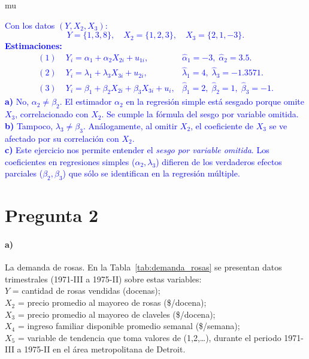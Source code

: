 mu\documentclass[10pt]{article}
\begin{document}
\textcolor{blue}{ 
    Con los datos \((Y, X_2, X_3)\):  
    \[
    Y=\{1,3,8\},\quad X_2=\{1,2,3\},\quad X_3=\{2,1,-3\}.
    \]
    \textbf{Estimaciones:}
    \begin{align*}
    (1)\;& Y_i=\alpha_1+\alpha_2X_{2i}+u_{1i}, & \hat{\alpha}_1=-3,\; \hat{\alpha}_2=3.5. \\
    (2)\;& Y_i=\lambda_1+\lambda_3X_{3i}+u_{2i}, & \hat{\lambda}_1=4,\; \hat{\lambda}_3=-1.3571. \\
    (3)\;& Y_i=\beta_1+\beta_2X_{2i}+\beta_3X_{3i}+u_i, & \hat{\beta}_1=2,\; \hat{\beta}_2=1,\; \hat{\beta}_3=-1.
    \end{align*}
    \textbf{a)} No, \(\alpha_2 \neq \beta_2\). El estimador \(\alpha_2\) en la regresión simple está sesgado porque omite \(X_3\), correlacionado con \(X_2\). Se cumple la fórmula del sesgo por variable omitida.\\
    \textbf{b)} Tampoco, \(\lambda_3 \neq \beta_3\). Análogamente, al omitir \(X_2\), el coeficiente de \(X_3\) se ve afectado por su correlación con \(X_2\).\\
    \textbf{c)} Este ejercicio nos permite entender el \textit{sesgo por variable omitida}. Los coeficientes en regresiones simples (\(\alpha_2,\lambda_3\)) difieren de los verdaderos efectos parciales (\(\beta_2,\beta_3\)) que sólo se identifican en la regresión múltiple.
    }
\newpage
\section{Pregunta 2}
\paragraph*{a)} La demanda de rosas. En la Tabla~\ref{tab:demanda_rosas} se presentan datos trimestrales (1971-III a 1975-II) sobre estas variables:\\
$Y$ = cantidad de rosas vendidas (docenas);\\
$X_2$ = precio promedio al mayoreo de rosas (\$/docena);\\
$X_3$ = precio promedio al mayoreo de claveles (\$/docena);\\
$X_4$ = ingreso familiar disponible promedio semanal (\$/semana);\\
$X_5$ = variable de tendencia que toma valores de (1,2,\dots), durante el periodo 1971-III a 1975-II en el área metropolitana de Detroit.\\
\end{document}
